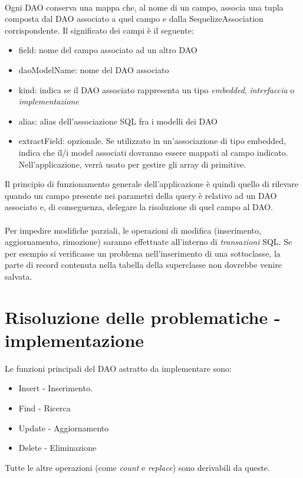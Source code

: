 \documentclass[a4paper, 12pt]{report}
\begin{document}
      \paragraph*{}
      Ogni DAO conserva una mappa che, al nome di un campo, associa una tupla composta dal DAO associato a quel campo e dalla SequelizeAssociation corrispondente.
      Il significato dei campi è il seguente:
      \begin{itemize}
        \item field: nome del campo associato ad un altro DAO
        \item daoModelName: nome del DAO associato
        \item kind: indica se il DAO associato rappresenta un tipo \emph{embedded}, \emph{interfaccia} o \emph{implementazione}
        \item alias: alias dell'associazione SQL fra i modelli dei DAO
        \item extractField: opzionale. Se utilizzato in un'associazione di tipo embedded, indica che il/i model associati dovranno essere mappati al campo indicato.
                            Nell'applicazione, verrà usato per gestire gli array di primitive.
      \end{itemize}
      Il principio di funzionamento generale dell'applicazione è quindi quello di rilevare quando un campo presente nei parametri della query è relativo ad un DAO associato e, di conseguenza, delegare la risoluzione di quel campo al DAO.
      \paragraph*{}
      Per impedire modifiche parziali, le operazioni di modifica (inserimento, aggiornamento, rimozione) saranno effettuate all'interno di \emph{transazioni} SQL.
      Se per esempio si verificasse un problema nell'inserimento di una sottoclasse, la parte di record contenuta nella tabella della superclasse non dovrebbe venire salvata.
    \newpage

    \section{Risoluzione delle problematiche - implementazione}
      Le funzioni principali del DAO astratto da implementare sono:
      \begin{itemize}
        \item Insert - Inserimento.
        \item Find   - Ricerca
        \item Update - Aggiornamento
        \item Delete - Eliminazione
      \end{itemize}
      Tutte le altre operazioni (come \emph{count} e \emph{replace}) sono derivabili da queste.
\end{document}
